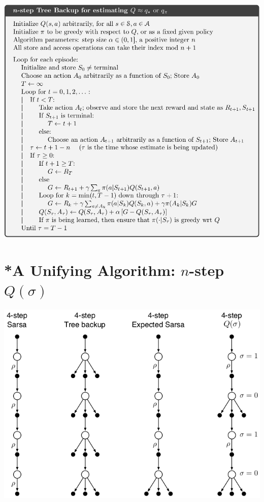 \begin{center}
    \includegraphics[width=\textwidth]{img/alg_n_step_tree_backup.png}
\end{center}

\section{*A Unifying Algorithm: $n$-step $Q(\sigma)$}
\label{sec:a_unifying_algorithm_n_step_q_sigma}

\begin{center}
    \includegraphics[width=\textwidth]{img/n_step_q_sigma_backup_diagram.png}
\end{center}


